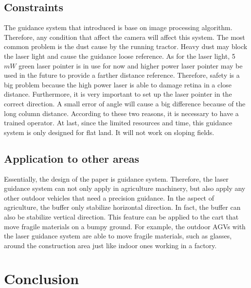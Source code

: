 \documentclass[letterpaper,12pt,oneside]{book}
\begin{document}
		
		\section{Constraints}
		The guidance system that introduced is base on image processing algorithm. Therefore, any condition that affect the camera will affect this system. The most common problem is the dust cause by the running tractor. Heavy dust may block the laser light and cause the guidance loose reference. As for the laser light, 5 $mW$ green laser pointer is in use for now and higher power laser pointer may be used in the future to provide a farther distance reference. Therefore, safety is a big problem because the high power laser is able to damage retina in a close distance. Furthermore, it is very important to set up the laser pointer in the correct direction. A small error of angle will cause a big difference because of the long column distance. According to these two reasons, it is necessary to have a trained operator. At last, since the limited resources and time, this guidance system is only designed for flat land. It will not work on sloping fields.
		
		
		\section{Application to other areas}
		Essentially, the design of the paper is guidance system. Therefore, the laser guidance system can not only apply in agriculture machinery, but also apply any other outdoor vehicles that need a precision guidance. In the aspect of agriculture, the buffer only stabilize horizontal direction. In fact, the buffer can also be stabilize vertical direction. This feature can be applied to the cart that move fragile materials on a bumpy ground. For example, the outdoor AGVs with the laser guidance system are able to move fragile materials, such as glasses, around the construction area just like indoor ones working in a factory. 
		
		\chapter{Conclusion}
		
\end{document}
